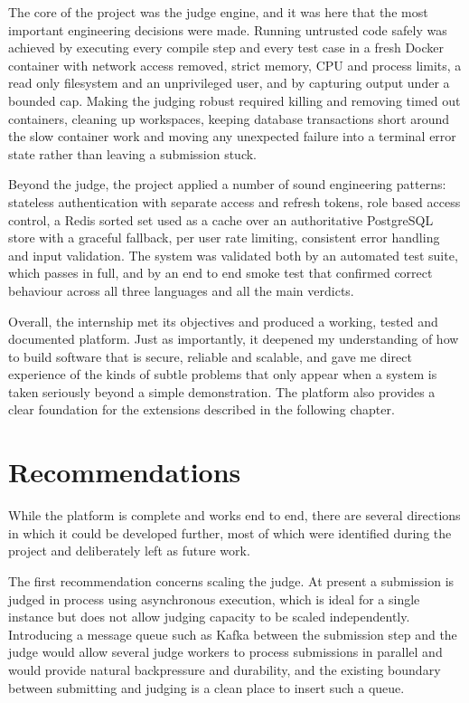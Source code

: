 \documentclass[12pt,a4paper]{report}
\begin{document}
The core of the project was the judge engine, and it was here that the most important engineering decisions were made. Running untrusted code safely was achieved by executing every compile step and every test case in a fresh Docker container with network access removed, strict memory, CPU and process limits, a read only filesystem and an unprivileged user, and by capturing output under a bounded cap. Making the judging robust required killing and removing timed out containers, cleaning up workspaces, keeping database transactions short around the slow container work and moving any unexpected failure into a terminal error state rather than leaving a submission stuck.

Beyond the judge, the project applied a number of sound engineering patterns: stateless authentication with separate access and refresh tokens, role based access control, a Redis sorted set used as a cache over an authoritative PostgreSQL store with a graceful fallback, per user rate limiting, consistent error handling and input validation. The system was validated both by an automated test suite, which passes in full, and by an end to end smoke test that confirmed correct behaviour across all three languages and all the main verdicts.

Overall, the internship met its objectives and produced a working, tested and documented platform. Just as importantly, it deepened my understanding of how to build software that is secure, reliable and scalable, and gave me direct experience of the kinds of subtle problems that only appear when a system is taken seriously beyond a simple demonstration. The platform also provides a clear foundation for the extensions described in the following chapter.

\chapter*{Recommendations}

While the platform is complete and works end to end, there are several directions in which it could be developed further, most of which were identified during the project and deliberately left as future work.

The first recommendation concerns scaling the judge. At present a submission is judged in process using asynchronous execution, which is ideal for a single instance but does not allow judging capacity to be scaled independently. Introducing a message queue such as Kafka between the submission step and the judge would allow several judge workers to process submissions in parallel and would provide natural backpressure and durability, and the existing boundary between submitting and judging is a clean place to insert such a queue.
\end{document}
